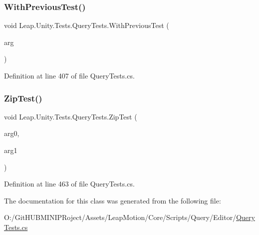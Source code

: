 \subsubsection{\texorpdfstring{WithPreviousTest()}{WithPreviousTest()}}
{\footnotesize\ttfamily void Leap.\+Unity.\+Tests.\+Query\+Tests.\+With\+Previous\+Test (\begin{DoxyParamCaption}\item[{\mbox{[}\+Value\+Source(\char`\"{}list0\char`\"{})\mbox{]} \mbox{\hyperlink{class_leap_1_1_unity_1_1_tests_1_1_query_tests_1_1_query_arg}{Query\+Arg}}}]{arg }\end{DoxyParamCaption})}



Definition at line 407 of file Query\+Tests.\+cs.

\mbox{\label{class_leap_1_1_unity_1_1_tests_1_1_query_tests_a533a30e78ecc23326b974002ffda3b87}} 
\subsubsection{\texorpdfstring{ZipTest()}{ZipTest()}}
{\footnotesize\ttfamily void Leap.\+Unity.\+Tests.\+Query\+Tests.\+Zip\+Test (\begin{DoxyParamCaption}\item[{\mbox{[}\+Value\+Source(\char`\"{}list0\char`\"{})\mbox{]} \mbox{\hyperlink{class_leap_1_1_unity_1_1_tests_1_1_query_tests_1_1_query_arg}{Query\+Arg}}}]{arg0,  }\item[{\mbox{[}\+Value\+Source(\char`\"{}list1\char`\"{})\mbox{]} \mbox{\hyperlink{class_leap_1_1_unity_1_1_tests_1_1_query_tests_1_1_query_arg}{Query\+Arg}}}]{arg1 }\end{DoxyParamCaption})}



Definition at line 463 of file Query\+Tests.\+cs.



The documentation for this class was generated from the following file\+:\begin{DoxyCompactItemize}
\item 
O\+:/\+Git\+H\+U\+B\+M\+I\+N\+I\+P\+Roject/\+Assets/\+Leap\+Motion/\+Core/\+Scripts/\+Query/\+Editor/\mbox{\hyperlink{_query_tests_8cs}{Query\+Tests.\+cs}}\end{DoxyCompactItemize}
